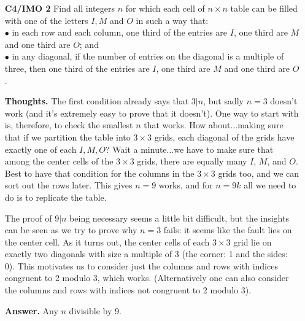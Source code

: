 \documentclass[11pt,a4paper]{article}
\begin{document}
\begin{itemize}
\item[\textbf{C4/IMO 2}]
Find all integers $n$ for which each cell of $n \times n$ table can be filled with one of the letters $I,M$ and $O$ in such a way that:\\
$\bullet$ in each row and each column, one third of the entries are $I$, one third are $M$ and one third are $O$; and \\
$\bullet$ in any diagonal, if the number of entries on the diagonal is a multiple of three, then one third of the entries are $I$, one third are $M$ and one third are $O$. 

\textbf{Thoughts.} 
The first condition already says that $3|n$, but sadly $n=3$ doesn't work (and it's extremely easy to prove that it doesn't). 
One way to start with is, therefore, to check the smallest $n$ that works. 
How about...making sure that if we partition the table into $3\times 3$ grids, each diagonal of the grids have exactly one of each $I, M, O$? 
Wait a minute...we have to make sure that among the center cells of the $3\times 3$ grids, there are equally many $I$, $M$, and $O$. 
Best to have that condition for the columns in the $3\times 3$ grids too, and we can sort out the rows later. 
This gives $n=9$ works, and for $n=9k$ all we need to do is to replicate the table. 

The proof of $9|n$ being necessary seems a little bit difficult, but the insights can be seen as we try to prove why $n=3$ fails: 
it seems like the fault lies on the center cell. 
As it turns out, the center cells of each $3\times 3$ grid lie on exactly two diagonals with size a multiple of 3 
(the corner: 1 and the sides: 0). 
This motivates us to consider just the columns and rows with indices congruent to 2 modulo 3, which works. 
(Alternatively one can also consider the columns and rows with indices not congruent to 2 modulo 3). 

\textbf{Answer.} Any $n$ divisible by 9. 


\end{itemize}
\end{document}
